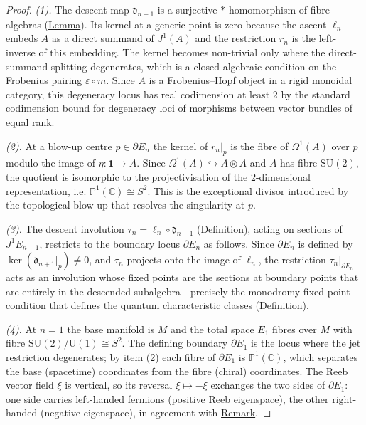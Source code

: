 \begin{proof}
\emph{(1).} The descent map $\mathfrak{d}_{n+1}$ is a surjective
$*$-homomorphism of fibre algebras (\hyperref[lem:descent]{Lemma}).  Its kernel at a
generic point is zero because the ascent $\ell_n$ embeds $A$ as a direct
summand of $J^1(A)$ and the restriction $r_n$ is the left-inverse of this
embedding.  The kernel becomes non-trivial only where the direct-summand
splitting degenerates, which is a closed algebraic condition on the
Frobenius pairing $\varepsilon \circ m$.  Since $A$ is a Frobenius--Hopf
object in a rigid monoidal category, this degeneracy locus has real
codimension at least 2 by the standard codimension bound for degeneracy loci
of morphisms between vector bundles of equal rank.

\emph{(2).} At a blow-up centre $p \in \partial E_n$ the kernel of
$r_n|_p$ is the fibre of $\Omega^1(A)$ over $p$ modulo the image of
$\eta\colon \mathbf{1} \to A$.  Since
$\Omega^1(A) \hookrightarrow A \otimes A$ and $A$ has fibre
$\mathrm{SU}(2)$, the quotient is isomorphic to the projectivisation of
the $2$-dimensional representation, i.e.
$\mathbb{P}^1(\mathbb{C}) \cong S^2$.  This is the exceptional divisor introduced
by the topological blow-up that resolves the singularity at $p$.

\emph{(3).} The descent involution $\tau_n = \ell_n \circ \mathfrak{d}_{n+1}$
(\hyperref[def:descent-involution]{Definition}), acting on sections of
$J^1 E_{n+1}$, restricts to the boundary locus $\partial E_n$ as follows.
Since $\partial E_n$ is defined by $\ker(\mathfrak{d}_{n+1}|_p) \neq 0$,
and $\tau_n$ projects onto the image of $\ell_n$, the restriction
$\tau_n|_{\partial E_n}$ acts as an involution whose fixed points are
the sections at boundary points that are entirely in the descended
subalgebra---precisely the monodromy fixed-point condition that
defines the quantum characteristic classes
(\hyperref[def:quantum-characteristic-classes]{Definition}).

\emph{(4).} At $n = 1$ the base manifold is $M$ and the total space
$E_1$ fibres over $M$ with fibre $\mathrm{SU}(2)/\mathrm{U}(1) \cong S^2$.
The defining boundary $\partial E_1$ is the locus where the jet
restriction degenerates; by item (2) each fibre of $\partial E_1$ is
$\mathbb{P}^1(\mathbb{C})$, which separates the base (spacetime) coordinates from the
fibre (chiral) coordinates.  The Reeb vector field $\xi$ is vertical, so
its reversal $\xi \mapsto -\xi$ exchanges the two sides of $\partial E_1$:
one side carries left-handed fermions (positive Reeb eigenspace), the other
right-handed (negative eigenspace), in agreement with
\hyperref[rem:descartes-chirality]{Remark}.
\end{proof}

